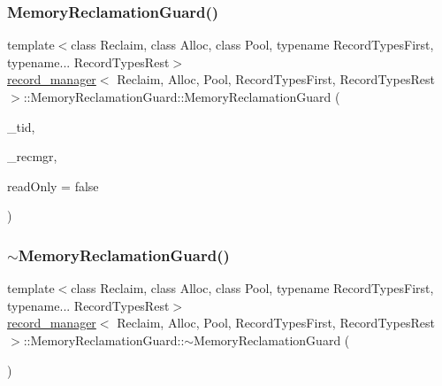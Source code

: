 \subsubsection{\texorpdfstring{Memory\+Reclamation\+Guard()}{MemoryReclamationGuard()}}
{\footnotesize\ttfamily template$<$class Reclaim, class Alloc, class Pool, typename Record\+Types\+First, typename... Record\+Types\+Rest$>$ \\
\hyperlink{classrecord__manager}{record\+\_\+manager}$<$ Reclaim, Alloc, Pool, Record\+Types\+First, Record\+Types\+Rest $>$\+::Memory\+Reclamation\+Guard\+::\+Memory\+Reclamation\+Guard (\begin{DoxyParamCaption}\item[{const int}]{\+\_\+tid,  }\item[{\hyperlink{classrecord__manager}{record\+\_\+manager}$<$ Reclaim, Alloc, Pool, Record\+Types\+First, Record\+Types\+Rest... $>$ $\ast$}]{\+\_\+recmgr,  }\item[{const bool}]{read\+Only = {\ttfamily false} }\end{DoxyParamCaption})\hspace{0.3cm}{\ttfamily [inline]}}

\mbox{\label{classrecord__manager_1_1MemoryReclamationGuard_acbedb9b1c0aa0c9c0527964911adb6dc}} 
\subsubsection{\texorpdfstring{$\sim$\+Memory\+Reclamation\+Guard()}{~MemoryReclamationGuard()}}
{\footnotesize\ttfamily template$<$class Reclaim, class Alloc, class Pool, typename Record\+Types\+First, typename... Record\+Types\+Rest$>$ \\
\hyperlink{classrecord__manager}{record\+\_\+manager}$<$ Reclaim, Alloc, Pool, Record\+Types\+First, Record\+Types\+Rest $>$\+::Memory\+Reclamation\+Guard\+::$\sim$\+Memory\+Reclamation\+Guard (\begin{DoxyParamCaption}{ }\end{DoxyParamCaption})\hspace{0.3cm}{\ttfamily [inline]}}



